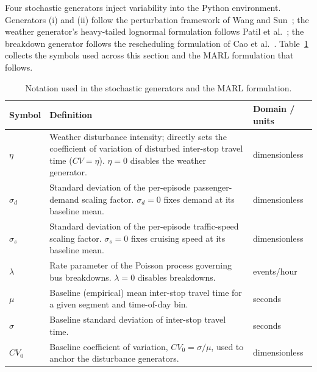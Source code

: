 Four stochastic generators inject variability into the Python environment. Generators (i) and (ii) follow the perturbation framework of Wang and Sun~\cite{Wangsun}; the weather generator's heavy-tailed lognormal formulation follows Patil et al.~\cite{Patil2025Conformal}; the breakdown generator follows the rescheduling formulation of Cao et al.~\cite{Cao2022Train}. Table~\ref{tab:notation} collects the symbols used across this section and the MARL formulation that follows.


\begin{table}[htbp]
\centering
\caption{Notation used in the stochastic generators and the MARL formulation.}
\label{tab:notation}

\small
\renewcommand{\arraystretch}{1.25}

\begin{tabularx}{\textwidth}{
>{\RaggedRight\arraybackslash}p{}
>{\RaggedRight\arraybackslash}X
>{\RaggedRight\arraybackslash}p{}
}

\toprule
\textbf{Symbol} & \textbf{Definition} & \textbf{Domain / units} \\
\midrule

$\eta$ &
Weather disturbance intensity; directly sets the coefficient of variation of disturbed inter-stop travel time ($CV=\eta$). $\eta=0$ disables the weather generator. &
dimensionless \\

$\sigma_d$ &
Standard deviation of the per-episode passenger-demand scaling factor. $\sigma_d=0$ fixes demand at its baseline mean. &
dimensionless \\

$\sigma_s$ &
Standard deviation of the per-episode traffic-speed scaling factor. $\sigma_s=0$ fixes cruising speed at its baseline mean. &
dimensionless \\

$\lambda$ &
Rate parameter of the Poisson process governing bus breakdowns. $\lambda=0$ disables breakdowns. &
events/hour \\

$\mu$ &
Baseline (empirical) mean inter-stop travel time for a given segment and time-of-day bin. &
seconds \\

$\sigma$ &
Baseline standard deviation of inter-stop travel time. &
seconds \\

$CV_0$ &
Baseline coefficient of variation, $CV_0=\sigma/\mu$, used to anchor the disturbance generators. &
dimensionless \\


\end{tabularx}
\end{table}

